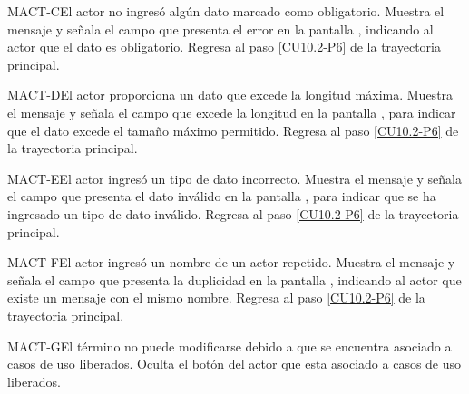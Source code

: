 	\begin{UCtrayectoriaA}{MACT-C}{El actor no ingresó algún dato marcado como obligatorio.}
		\UCpaso[\UCsist] Muestra el mensaje  y señala el campo que presenta el error en la pantalla , indicando al actor que el dato es obligatorio.
		\UCpaso Regresa al paso \ref{CU10.2-P6} de la trayectoria principal.
	\end{UCtrayectoriaA}

	\begin{UCtrayectoriaA}{MACT-D}{El actor proporciona un dato que excede la longitud máxima.}
		\UCpaso[\UCsist] Muestra el mensaje  y señala el campo que excede la longitud en la pantalla , para indicar que el dato excede el tamaño máximo permitido.
		\UCpaso Regresa al paso \ref{CU10.2-P6} de la trayectoria principal.
	\end{UCtrayectoriaA}

	\begin{UCtrayectoriaA}{MACT-E}{El actor ingresó un tipo de dato incorrecto.}
		\UCpaso[\UCsist] Muestra el mensaje  y señala el campo que presenta el dato inválido en la pantalla , para indicar que se ha ingresado un tipo de dato inválido.
		\UCpaso Regresa al paso \ref{CU10.2-P6} de la trayectoria principal.
	\end{UCtrayectoriaA}
	
	\begin{UCtrayectoriaA}{MACT-F}{El actor ingresó un nombre de un actor repetido.}
		\UCpaso[\UCsist] Muestra el mensaje  y señala el campo que presenta la duplicidad en la pantalla , indicando al actor que existe un mensaje con el mismo nombre.
		\UCpaso Regresa al paso \ref{CU10.2-P6} de la trayectoria principal.
	\end{UCtrayectoriaA}

	\begin{UCtrayectoriaA}{MACT-G}{El término no puede modificarse debido a que se encuentra asociado a casos de uso liberados.}
		\UCpaso[\UCsist] Oculta el botón \editar del actor que esta asociado a casos de uso liberados.
	\end{UCtrayectoriaA}
